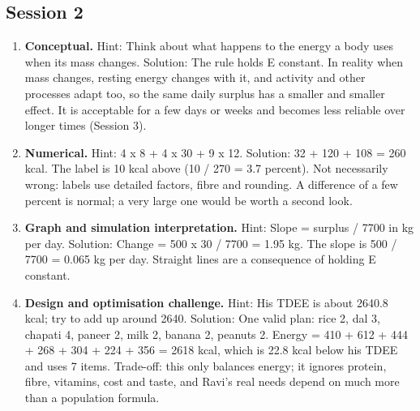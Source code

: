\documentclass[11pt,a4paper]{article}
\begin{document}
\subsection*{Session 2}
\begin{enumerate}[nosep]
\item \textbf{Conceptual.} Hint: Think about what happens to the energy a body uses when its mass changes. Solution: The rule holds E constant. In reality when mass changes, resting energy changes with it, and activity and other processes adapt too, so the same daily surplus has a smaller and smaller effect. It is acceptable for a few days or weeks and becomes less reliable over longer times (Session 3).
\item \textbf{Numerical.} Hint: 4 x 8 + 4 x 30 + 9 x 12. Solution: 32 + 120 + 108 = 260 kcal. The label is 10 kcal above (10 / 270 = 3.7 percent). Not necessarily wrong: labels use detailed factors, fibre and rounding. A difference of a few percent is normal; a very large one would be worth a second look.
\item \textbf{Graph and simulation interpretation.} Hint: Slope = surplus / 7700 in kg per day. Solution: Change = 500 x 30 / 7700 = 1.95 kg. The slope is 500 / 7700 = 0.065 kg per day. Straight lines are a consequence of holding E constant.
\item \textbf{Design and optimisation challenge.} Hint: His TDEE is about 2640.8 kcal; try to add up around 2640. Solution: One valid plan: rice 2, dal 3, chapati 4, paneer 2, milk 2, banana 2, peanuts 2. Energy = 410 + 612 + 444 + 268 + 304 + 224 + 356 = 2618 kcal, which is 22.8 kcal below his TDEE and uses 7 items. Trade-off: this only balances energy; it ignores protein, fibre, vitamins, cost and taste, and Ravi's real needs depend on much more than a population formula.
\end{enumerate}
\end{document}
